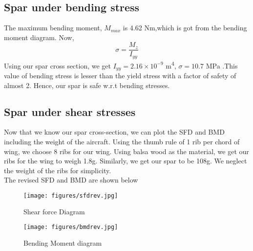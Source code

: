 \documentclass[a4paper,10pt]{report}
\begin{document}
\subsection{Spar under bending stress}
The maximum bending moment, $M_{max}$ is 4.62 Nm,which is got from the bending moment diagram. Now,
\begin{equation} \sigma = \frac{M_z}{I_{yy}}  \end{equation}
Using our spar cross section, we get
$ I_{yy} = 2.16\times10^{-9} $ m\textsuperscript{4}, $\sigma = 10.7$ MPa
.This value of bending stress is lesser than the yield stress with a factor of safety of almost 2. Hence, our spar is safe w.r.t bending stresses.

\subsection{Spar under shear stresses}
Now that we know our spar cross-section, we can plot the SFD and BMD including the weight of the aircraft. 
Using the thumb rule of 1 rib per chord of wing, we choose 8 ribs for our wing. Using balsa wood as the material, we get our ribs for the wing to weigh 1.8g. Similarly, we get our spar to be 108g. We neglect the weight of the ribs for simplicity. 
\\
The revised SFD and BMD are shown below
\begin{figure}[H]
    \begin{center}
      \texttt{[image: figures/sfdrev.jpg]}
\caption{Shear force Diagram}
       \label{fig:SFDrev}
    \end{center}
\end{figure}
\begin{figure}[H]
    \begin{center}
      \texttt{[image: figures/bmdrev.jpg]}
\caption{Bending Moment diagram}
       \label{fig:BMDrev}
    \end{center}
\end{figure}
\end{document}
